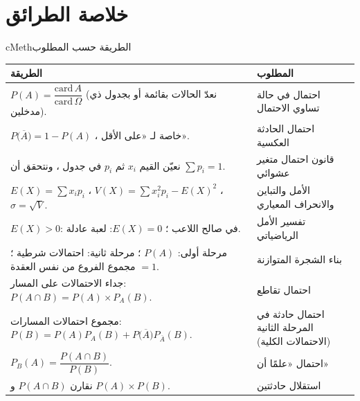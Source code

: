 \documentclass[12pt,a4paper]{article}
\newenvironment{BOX}[2]{\begin{otherlanguage}{english}\begin{arbox}{#1}{#2}}{\end{arbox}\end{otherlanguage}}
\begin{document}
\section{خلاصة الطرائق}
\begin{BOX}{cMeth}{الطريقة حسب المطلوب}
\begin{center}
\renewcommand{\arraystretch}{1.5}
\begin{tabular}{|p{}|p{}|}\hline
\rowcolor{cSec!12} \textbf{الطريقة} & \textbf{المطلوب}\\\hline
$P(A)=\dfrac{\text{card}\,A}{\text{card}\,\Omega}$ (نعدّ الحالات بقائمة أو بجدول ذي مدخلين). & احتمال في حالة تساوي الاحتمال\\\hline
$P\big(\overline A\big)=1-P(A)$ ، خاصة لـ «على الأقل». & احتمال الحادثة العكسية\\\hline
نعيّن القيم $x_i$ ثم $p_i$ في جدول ، ونتحقق أن $\sum p_i=1$. & قانون احتمال متغير عشوائي\\\hline
$E(X)=\sum x_ip_i$ ، $V(X)=\sum x_i^2p_i-E(X)^2$ ، $\sigma=\sqrt V$. & الأمل والتباين والانحراف المعياري\\\hline
$E(X)>0$: في صالح اللاعب ؛ $E(X)=0$: لعبة عادلة. & تفسير الأمل الرياضياتي\\\hline
مرحلة أولى: $P(A)$ ؛ مرحلة ثانية: احتمالات شرطية ؛ مجموع الفروع من نفس العقدة $=1$. & بناء الشجرة المتوازنة\\\hline
جداء الاحتمالات على المسار: $P(A\cap B)=P(A)\times P_A(B)$. & احتمال تقاطع\\\hline
مجموع احتمالات المسارات: $P(B)=P(A)P_A(B)+P\big(\overline A\big)P_{\overline A}(B)$. & احتمال حادثة في المرحلة الثانية (الاحتمالات الكلية)\\\hline
$P_B(A)=\dfrac{P(A\cap B)}{P(B)}$. & احتمال «علمًا أن»\\\hline
نقارن $P(A\cap B)$ و $P(A)\times P(B)$. & استقلال حادثتين\\\hline
\end{tabular}
\end{center}
\end{BOX}
\end{document}
